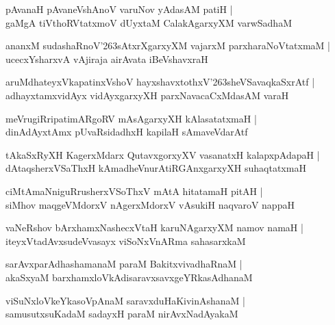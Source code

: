\documentclass[twoside,12pt,openright]{book}
\def\S{\char'263}
\newcounter{shloka}[chapter]
\begin{document}
\begin{shloka}%
pAvanaH pAvaneVshAnoV varuNov yAdasAM patiH |\\
gaMgA tiVthoRVtatxmoV dUyxtaM CalakAgarxyXM varwSadhaM 
\end{shloka}

\begin{shloka}%
ananxM sudashaRnoV\S sAtxrXgarxyXM vajarxM parxharaNoVtatxmaM |\\
ucecxYsharxvA vAjiraja airAvata iBeVshavxraH 
\end{shloka}

\begin{shloka}%
aruMdhateyxVkapatinxVshoV hayxshavxtothxV\S sheVSavaqkaSxrAtf |\\
adhayxtamxvidAyx vidAyxgarxyXH parxNavacaCxMdasAM varaH 
\end{shloka}

\begin{shloka}%
meVrugiRripatimARgoRV mAsAgarxyXH kAlasatatxmaH |\\
dinAdAyxtAmx pUvaRsidadhxH kapilaH sAmaveVdarAtf 
\end{shloka}

\begin{shloka}%
tAkaSxRyXH KagerxMdarx QutavxgorxyXV vasanatxH kalapxpAdapaH |\\
dAtaqsherxVSaThxH kAmadheVnurAtiRGAnxgarxyXH suhaqtatxmaH 
\end{shloka}

\begin{shloka}%
ciMtAmaNniguRrusherxVSoThxV mAtA hitatamaH pitAH |\\
siMhov maqgeVMdorxV nAgerxMdorxV vAsukiH naqvaroV nappaH
\end{shloka}

\begin{shloka}%
vaNeRshov bArxhamxNashecxVtaH karuNAgarxyXM namov namaH |\\
iteyxVtadAvxsudeVvasayx viSoNxVnARma sahasarxkaM 
\end{shloka}

\begin{shloka}%
sarAvxparAdhashamanaM paraM BakitxvivadhaRnaM |\\
akaSxyaM barxhamxloVkAdisaravxsavxgeYRkasAdhanaM 
\end{shloka}

\begin{shloka}%
viSuNxloVkeYkasoVpAnaM saravxduHaKivinAshanaM |\\
samusutxsuKadaM sadayxH paraM nirAvxNadAyakaM 
\end{shloka}
\end{document}
